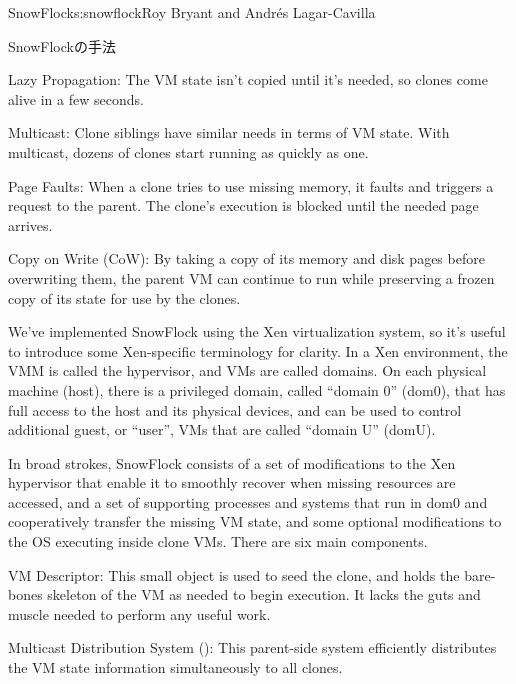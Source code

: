 \begin{aosachapter}{SnowFlock}{s:snowflock}{Roy Bryant and Andr\'e{s} Lagar-Cavilla}
\begin{aosasect1}{SnowFlockの手法}
\begin{aosaitemize}
  \item Lazy Propagation: The VM state isn't copied until it's needed,
  so clones come alive in a few seconds.

  \item Multicast: Clone siblings have similar needs in terms of VM
  state. With multicast, dozens of clones start running as quickly
  as one.

  \item Page Faults: When a clone tries to use missing memory, it
  faults and triggers a request to the parent. The clone's execution
  is blocked until the needed page arrives.

  \item Copy on Write (CoW): By taking a copy of its memory and disk
  pages before overwriting them, the parent VM can continue to run
  while preserving a frozen copy of its state for use by the clones.

\end{aosaitemize}

We've implemented SnowFlock using the Xen virtualization system, so
it's useful to introduce some Xen-specific terminology for clarity. In
a Xen environment, the VMM is called the hypervisor, and VMs are
called domains. On each physical machine (host), there is a privileged
domain, called ``domain 0'' (dom0), that has full access to the host
and its physical devices, and can be used to control additional guest, or ``user'',
VMs that are called ``domain U'' (domU).

In broad strokes, SnowFlock consists of a set of modifications to the
Xen hypervisor that enable it to smoothly recover when missing
resources are accessed, and a set of supporting processes and systems
that run in dom0 and cooperatively transfer the missing VM state, and
some optional modifications to the OS executing inside clone
VMs. There are six main components.

\begin{aosaitemize}

  \item VM Descriptor: This small object is used to seed the clone,
  and holds the bare-bones skeleton of the VM as needed to begin
  execution.  It lacks the guts and muscle needed to perform any
  useful work.

  \item Multicast Distribution System (): This
  parent-side system efficiently distributes the VM state
  information simultaneously to all clones.


\end{aosaitemize}
\end{aosasect1}
\end{aosachapter}
